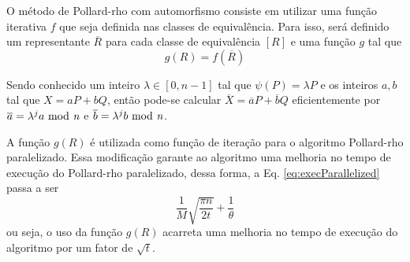 O método de Pollard-rho com automorfismo consiste em utilizar uma função iterativa $f$ que seja definida nas classes de equivalência. Para isso, será definido um representante $\overline{R}$ para cada classe de equivalência $[R]$ e uma função $g$ tal que
$$
g(R) = f(\overline{R})
$$

Sendo conhecido um inteiro $\lambda \in [0, n - 1]$ tal que $\psi(P) = \lambda P$ e os inteiros $a,b$ tal que $X = aP + bQ$, então pode-se calcular $\overline{X} = \overline{a}P + \overline{b}Q$ eficientemente por $\overline{a} = \lambda^{j}a \mbox{ mod \textit{n}}$ e $\overline{b} = \lambda^{j}b \mbox{ mod \textit{n}}$.

A função $g(R)$ é utilizada como função de iteração para o algoritmo Pollard-rho paralelizado. Essa modificação garante ao algoritmo uma melhoria no tempo de execução do Pollard-rho paralelizado, dessa forma, a Eq. \ref{eq:execParallelized} passa a ser
$$
\frac{1}{M} \sqrt{ \frac{\pi n}{2t} } + \frac{1}{\theta}
$$
ou seja, o uso da função $g(R)$ acarreta uma melhoria no tempo de execução do algoritmo por um fator de $\sqrt{t}$. \cite{Guide}
